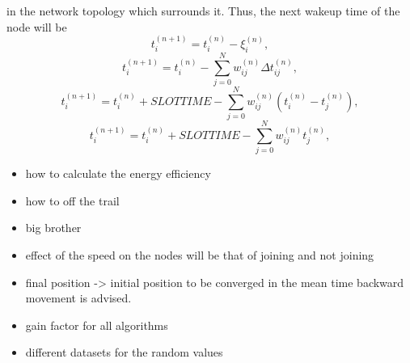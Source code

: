 \documentclass[a4paper,8pt]{report}
\begin{document}
 in the network topology which surrounds it. \newline
Thus, the next wakeup time of the node will be
\begin{equation}
t_i^{(n+1)} = t_i^{(n)} - \xi_i^{(n)} ,
\end{equation}
\begin{equation}
t_i^{(n+1)} = t_i^{(n)} - \sum_{j=0}^N{w_{ij}^{(n)}\Delta
t_{ij}^{(n)}} ,
\end{equation}
\begin{equation}
t_i^{(n+1)} = t_i^{(n)}+ SLOTTIME -
\sum_{j=0}^N{w_{ij}^{(n)}(t_i^{(n)}-t_j^{(n)})} ,
\end{equation}
\begin{equation}
t_i^{(n+1)} = t_i^{(n)} + SLOTTIME-
\sum_{j=0}^N{w_{ij}^{(n)}t_j^{(n)}} ,
\end{equation}
\begin{itemize}
 \item how to calculate the energy efficiency
 \item how to off the trail
 \item big brother
 \item effect of the speed on the nodes will be that of joining and not joining
 \item final position -> initial position to be converged in the mean time  backward movement is advised.
 \item gain factor for all algorithms
 \item different datasets for the random values
\end{itemize}
\end{document}
